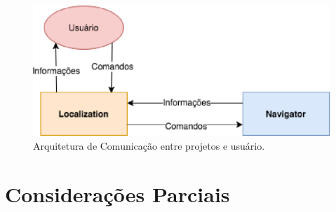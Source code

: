 	\begin{figure}[H]
		\centering
		\includegraphics[scale=0.8]{figuras/arq_pc.eps}
		\caption[Arquitetura de Comunicação]{Arquitetura de Comunicação entre projetos e usuário.}
		\label{img:arq_pc}
	\end{figure}




\section{Considerações Parciais}
